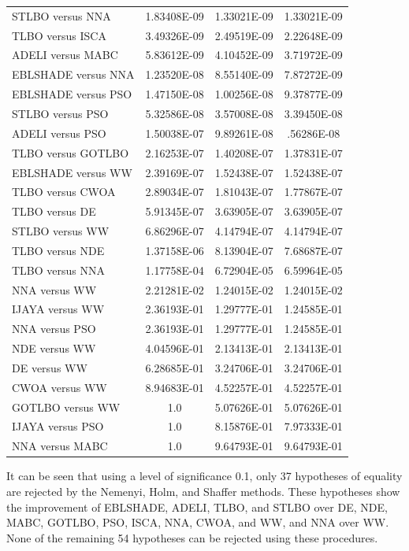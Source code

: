 \documentclass[a4paper,fleqn]{cas-sc}
\begin{document}
\begin{table}[<options>]
\begin{tabular*}{\tblwidth}{@{}LCCC@{}}
STLBO versus NNA&1.83408E-09&1.33021E-09&1.33021E-09\\
TLBO versus ISCA&3.49326E-09&2.49519E-09&2.22648E-09\\
ADELI versus MABC&5.83612E-09&4.10452E-09&3.71972E-09\\
EBLSHADE versus NNA&1.23520E-08&8.55140E-09&7.87272E-09\\
EBLSHADE versus PSO&1.47150E-08&1.00256E-08&9.37877E-09\\
STLBO versus PSO&5.32586E-08&3.57008E-08&3.39450E-08\\
ADELI versus PSO&1.50038E-07&9.89261E-08&.56286E-08\\
TLBO versus GOTLBO&2.16253E-07&1.40208E-07&1.37831E-07\\
EBLSHADE versus WW&2.39169E-07&1.52438E-07&1.52438E-07\\
TLBO versus CWOA&2.89034E-07&1.81043E-07&1.77867E-07\\
TLBO versus DE&5.91345E-07&3.63905E-07&3.63905E-07\\
STLBO versus WW&6.86296E-07&4.14794E-07&4.14794E-07\\
TLBO versus NDE&1.37158E-06&8.13904E-07&7.68687E-07\\
TLBO versus NNA&1.17758E-04&6.72904E-05&6.59964E-05\\
NNA versus WW&2.21281E-02&1.24015E-02&1.24015E-02\\
IJAYA versus WW&2.36193E-01&1.29777E-01&1.24585E-01\\
NNA versus PSO&2.36193E-01&1.29777E-01&1.24585E-01\\
NDE versus WW&4.04596E-01&2.13413E-01&2.13413E-01\\
DE versus WW&6.28685E-01&3.24706E-01&3.24706E-01\\
CWOA versus WW&8.94683E-01&4.52257E-01&4.52257E-01\\
GOTLBO versus WW&1.0&5.07626E-01&5.07626E-01\\
IJAYA versus PSO&1.0&8.15876E-01&7.97333E-01\\
NNA versus MABC&1.0&9.64793E-01&9.64793E-01\\
\bottomrule
\end{tabular*}
\end{table}


It can be seen that using a level of significance 0.1, only 37 hypotheses of equality
are rejected by the Nemenyi, Holm, and Shaffer methods.
These hypotheses show the improvement of EBLSHADE, ADELI,  TLBO, and STLBO
over DE, NDE, MABC, GOTLBO, PSO, ISCA, NNA, CWOA, and WW,
and NNA over WW.
None of the remaining 54 hypotheses can be rejected using these procedures.
\end{document}
